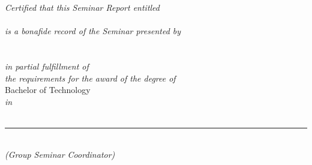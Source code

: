 {\centering

\large

{\Large \myCollegeName{}\\[0.2cm]
	\myDeptName{}}\\[1cm]

\textit{Certified that this Seminar Report entitled}\\[1cm]

{\Large \textbf{\myTopic{}}}\\[1.0cm]

\textit{is a bonafide record of the Seminar presented by}\\[0.5cm]

{\large \textbf{\myName{}\\
	\myRollNo{}}}\\[0.5cm]

\textit{in partial fulfillment of\\
	the requirements for the award of the degree of}\\[0.5cm]

{\Large {Bachelor of Technology}}\\
\textit{in\\
	{\Large \myBranchName{}}}\\[1.5cm]

\vfill
\hrule
\vspace{1cm}

\textbf{\mySeminarCoordinator{}}\\
\textit{(Group Seminar Coordinator)\\
	\myDeptName{}}\\
}

